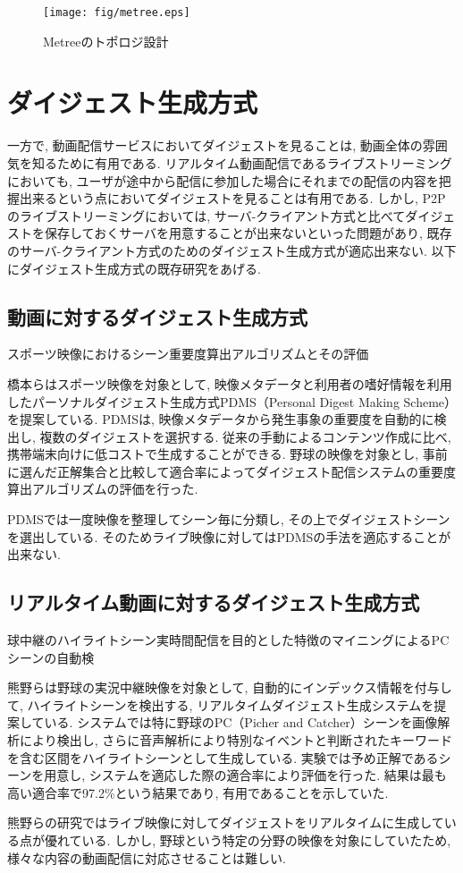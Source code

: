 \begin{figure}
  \centering
  \texttt{[image: fig/metree.eps]}
  \caption{Metreeのトポロジ設計}
  \label{fig:metree}
\end{figure}

\newpage

\section{ダイジェスト生成方式}
一方で, 動画配信サービスにおいてダイジェストを見ることは, 動画全体の雰囲気を知るために有用である. リアルタイム動画配信であるライブストリーミングにおいても, ユーザが途中から配信に参加した場合にそれまでの配信の内容を把握出来るという点においてダイジェストを見ることは有用である. しかし, P2Pのライブストリーミングにおいては, サーバ-クライアント方式と比べてダイジェストを保存しておくサーバを用意することが出来ないといった問題があり, 既存のサーバ-クライアント方式のためのダイジェスト生成方式が適応出来ない. 以下にダイジェスト生成方式の既存研究をあげる.

\subsection{動画に対するダイジェスト生成方式}

スポーツ映像におけるシーン重要度算出アルゴリズムとその評価

橋本らはスポーツ映像を対象として, 映像メタデータと利用者の嗜好情報を利用したパーソナルダイジェスト生成方式PDMS（Personal Digest Making Scheme）\cite{pdms}を提案している. PDMSは, 映像メタデータから発生事象の重要度を自動的に検出し, 複数のダイジェストを選択する. 従来の手動によるコンテンツ作成に比べ, 携帯端末向けに低コストで生成することができる. 野球の映像を対象とし, 事前に選んだ正解集合と比較して適合率によってダイジェスト配信システムの重要度算出アルゴリズムの評価を行った.

PDMSでは一度映像を整理してシーン毎に分類し, その上でダイジェストシーンを選出している. そのためライブ映像に対してはPDMSの手法を適応することが出来ない.

\subsection{リアルタイム動画に対するダイジェスト生成方式}

球中継のハイライトシーン実時間配信を目的とした特徴のマイニングによるPCシーンの自動検

熊野らは野球の実況中継映像を対象として, 自動的にインデックス情報を付与して, ハイライトシーンを検出する, リアルタイムダイジェスト生成システム\cite{yakyu}を提案している. システムでは特に野球のPC（Picher and Catcher）シーンを画像解析により検出し, さらに音声解析により特別なイベントと判断されたキーワードを含む区間をハイライトシーンとして生成している. 実験では予め正解であるシーンを用意し, システムを適応した際の適合率により評価を行った. 結果は最も高い適合率で97.2\%という結果であり, 有用であることを示していた.

熊野らの研究ではライブ映像に対してダイジェストをリアルタイムに生成している点が優れている. しかし, 野球という特定の分野の映像を対象にしていたため, 様々な内容の動画配信に対応させることは難しい.
